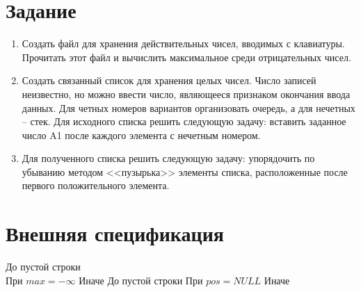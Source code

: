 

\renewcommand{\labnumber}{5}
\renewcommand{\tasks}{(5, 12, 2)}



\maketitle
\thispagestyle{empty}
\newpage
{}
\tableofcontents

\newpage
\section{Задание}
\begin{enumerate}
    \item Создать  файл для хранения действительных чисел, вводимых с
        клавиатуры. Прочитать этот файл и вычислить максимальное
        среди отрицательных чисел.
    \item Создать связанный список для хранения целых чисел. Число
        записей неизвестно, но можно ввести число, являющееся
        признаком окончания ввода данных. Для четных номеров
        вариантов организовать очередь, а для нечетных – стек. Для
        исходного списка решить следующую задачу: вставить заданное
        число A1 после каждого элемента с нечетным номером.
    \item Для полученного списка решить следующую задачу: упорядочить
        по убыванию методом <<пузырька>> элементы списка,
        расположенные после первого положительного элемента.
\end{enumerate}

\newpage
\section{Внешняя спецификация}
\specframe{
    Лабораторная работа №\labnumber
}
До пустой строки \\
При $max = -\infty$
Иначе
До пустой строки
При $pos = NULL$
Иначе

